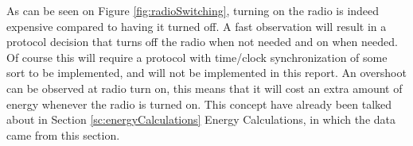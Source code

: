 \noindent As can be seen on Figure \ref{fig:radioSwitching}, turning on the radio is indeed expensive compared to having it turned off. A fast observation will result in a protocol decision that turns off the radio when not needed and on when needed. Of course this will require a protocol with time/clock synchronization of some sort to be implemented, and will not be implemented in this report. An overshoot can be observed at radio turn on, this means that it will cost an extra amount of energy whenever the radio is turned on. This concept have already been talked about in Section \ref{sc:energyCalculations} Energy Calculations, in which the data came from this section.